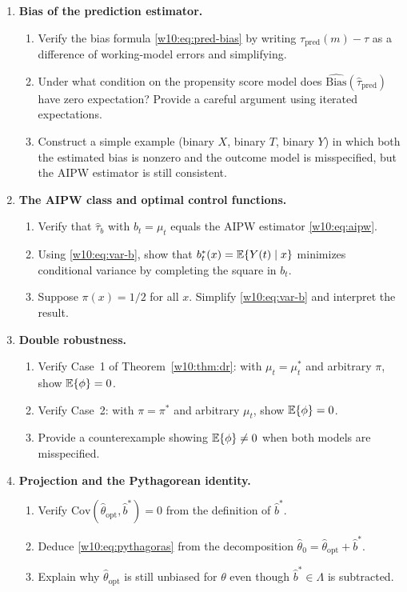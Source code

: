 \documentclass[master.tex]{subfiles}
\begin{document}
\begin{enumerate}

\item \textbf{Bias of the prediction estimator.}
  \begin{enumerate}
    \item Verify the bias formula \eqref{w10:eq:pred-bias} by
      writing $\tau_{\mathrm{pred}}(m)-\tau$ as a difference of
      working-model errors and simplifying.
    \item Under what condition on the propensity score model does
      $\widehat{\mathrm{Bias}}(\hat\tau_{\mathrm{pred}})$ have zero
      expectation?  Provide a careful argument using iterated
      expectations.
    \item Construct a simple example (binary $X$, binary $T$,
      binary $Y$) in which both the estimated bias is nonzero and
      the outcome model is misspecified, but the AIPW estimator
      is still consistent.
  \end{enumerate}

\item \textbf{The AIPW class and optimal control functions.}
  \begin{enumerate}
    \item Verify that $\hat\tau_b$ with $b_t=\mu_t$ equals the
      AIPW estimator \eqref{w10:eq:aipw}.
    \item Using \eqref{w10:eq:var-b}, show that
      $b_t^*(x)=\mathbb{E}\{Y(t)\mid x\}$ minimizes conditional variance
      by completing the square in $b_t$.
    \item Suppose $\pi(x)=1/2$ for all $x$.  Simplify
      \eqref{w10:eq:var-b} and interpret the result.
  \end{enumerate}

\item \textbf{Double robustness.}
  \begin{enumerate}
    \item Verify Case~1 of Theorem~\ref{w10:thm:dr}: with
      $\mu_t=\mu_t^*$ and arbitrary $\pi$, show
      $\mathbb{E}\{\phi\}=0$.
    \item Verify Case~2: with $\pi=\pi^*$ and arbitrary $\mu_t$,
      show $\mathbb{E}\{\phi\}=0$.
    \item Provide a counterexample showing $\mathbb{E}\{\phi\}\neq 0$ when
      both models are misspecified.
  \end{enumerate}

\item \textbf{Projection and the Pythagorean identity.}
  \begin{enumerate}
    \item Verify $\mathrm{Cov}(\hat\theta_{\mathrm{opt}},\hat b^*)=0$
      from the definition of $\hat b^*$.
    \item Deduce \eqref{w10:eq:pythagoras} from the decomposition
      $\hat\theta_0 = \hat\theta_{\mathrm{opt}} + \hat b^*$.
    \item Explain why $\hat\theta_{\mathrm{opt}}$ is still unbiased
      for $\theta$ even though $\hat b^* \in \Lambda$ is subtracted.
  \end{enumerate}


\end{enumerate}
\end{document}

